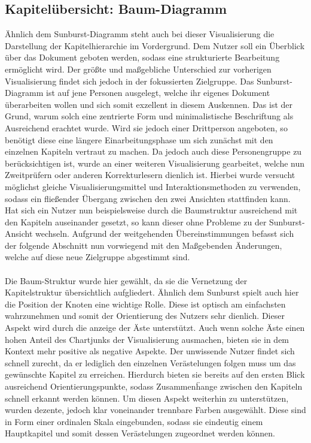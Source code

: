 \subsection{Kapitel\"ubersicht: Baum-Diagramm}
\"Ahnlich dem Sunburst-Diagramm steht auch bei dieser Visualisierung die Darstellung der Kapitelhierarchie im Vordergrund. Dem Nutzer soll ein \"Uberblick \"uber das Dokument geboten werden, sodass eine strukturierte Bearbeitung erm\"oglicht wird. Der gr\"o{\ss}te und ma{\ss}gebliche Unterschied zur vorherigen Visualisierung findet sich jedoch in der fokussierten Zielgruppe. Das Sunburst-Diagramm ist auf jene Personen ausgelegt, welche ihr eigenes Dokument \"uberarbeiten wollen und sich somit exzellent in diesem Auskennen. Das ist der Grund, warum solch eine zentrierte Form und minimalistische Beschriftung als Ausreichend erachtet wurde. Wird sie jedoch einer Drittperson angeboten, so ben\"otigt diese eine l\"angere Einarbeitungsphase um sich zun\"achst mit den einzelnen Kapiteln vertraut zu machen. Da jedoch auch diese Personengruppe zu ber\"ucksichtigen ist, wurde an einer weiteren Visualisierung gearbeitet, welche nun Zweitpr\"ufern oder anderen Korrekturlesern dienlich ist. Hierbei wurde versucht m\"oglichst gleiche Visualisierungsmittel und Interaktionsmethoden zu verwenden, sodass ein flie{\ss}ender \"Ubergang zwischen den zwei Ansichten stattfinden kann. Hat sich ein Nutzer nun beispielsweise durch die Baumstruktur ausreichend mit den Kapiteln auseinander gesetzt, so kann dieser ohne Probleme zu der Sunburst-Ansicht wechseln. Aufgrund der weitgehenden \"Ubereinstimmungen befasst sich der folgende Abschnitt nun vorwiegend mit den Ma{\ss}gebenden \"Anderungen, welche auf diese neue Zielgruppe abgestimmt sind.\\
\\
Die Baum-Struktur wurde hier gew\"ahlt, da sie die Vernetzung der Kapitelstruktur \"ubersichtlich aufgliedert. \"Ahnlich dem Sunburst spielt auch hier die Position der Knoten eine wichtige Rolle. Diese ist optisch am einfachsten wahrzunehmen und somit der Orientierung des Nutzers sehr dienlich. Dieser Aspekt wird durch die anzeige der \"Aste unterst\"utzt. Auch wenn solche \"Aste einen hohen Anteil des Chartjunks der Visualisierung ausmachen, bieten sie in dem Kontext mehr positive als negative Aspekte. Der unwissende Nutzer findet sich schnell zurecht, da er lediglich den einzelnen Ver\"astelungen folgen muss um das gew\"unschte Kapitel zu erreichen. Hierdurch bieten sie bereits auf den ersten Blick ausreichend Orientierungspunkte, sodass Zusammen\"hange zwischen den Kapiteln schnell erkannt werden k\"onnen. Um diesen Aspekt weiterhin zu unterst\"utzen, wurden dezente, jedoch klar voneinander trennbare Farben ausgew\"ahlt. Diese sind in Form einer ordinalen Skala eingebunden, sodass sie eindeutig einem Hauptkapitel und somit dessen Ver\"astelungen zugeordnet werden k\"onnen.\\
